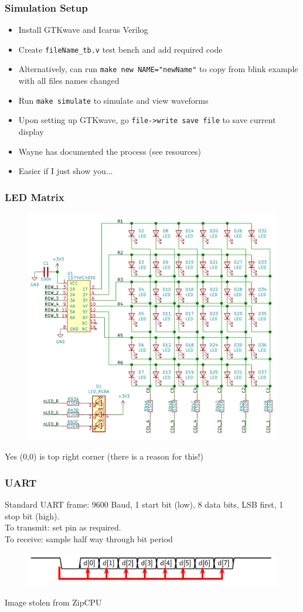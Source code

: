 \documentclass[t]{beamer}
\begin{document}
\begin{frame}[t]
	\frametitle{Simulation Setup}
	\begin{itemize}
		\item Install GTKwave and Icarus Verilog
		\item Create \texttt{fileName\_tb.v} test bench and add required code
		\item Alternatively, can run \texttt{make new NAME="newName"} to copy from blink example with all files names changed
		\item Run \texttt{make simulate} to simulate and view waveforms
		\item Upon setting up GTKwave, go \texttt{file->write save file} to save current display
		\item Wayne has documented the process (see resources)
		\item Easier if I just show you...
	\end{itemize}
\end{frame}


\begin{frame}[t]
	\frametitle{LED Matrix}
	\begin{figure}
		\includegraphics[width=0.6\linewidth]{ledMatrix.png}
	\end{figure}
	Yes (0,0) is top right corner (there is a reason for this!)
\end{frame}


\begin{frame}[t]
	\frametitle{UART}
	Standard UART frame: 9600 Baud, 1 start bit (low), 8 data bits, LSB first, 1 stop bit (high).\\
	To transmit: set pin as required. \\
	To receive: sample half way through bit period
	\begin{figure}
		\includegraphics[width=\linewidth]{uart.png}
	\end{figure}
	Image stolen from ZipCPU
\end{frame}
\end{document}
